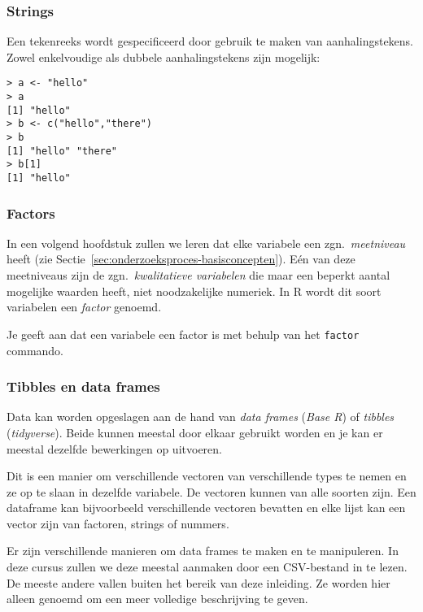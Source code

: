 \subsubsection{Strings}

Een tekenreeks wordt gespecificeerd door gebruik te maken van aanhalingstekens. Zowel enkelvoudige als dubbele aanhalingstekens zijn mogelijk:

\begin{lstlisting}
> a <- "hello"
> a
[1] "hello"
> b <- c("hello","there")
> b
[1] "hello" "there"
> b[1]
[1] "hello"
\end{lstlisting}

\subsubsection{Factors}

In een volgend hoofdstuk zullen we leren dat elke variabele een zgn.~\textit{meetniveau} heeft (zie Sectie~\ref{sec:onderzoeksproces-basisconcepten}). Eén van deze meetniveaus zijn de zgn.~\textit{kwalitatieve variabelen} die maar een beperkt aantal mogelijke waarden heeft, niet noodzakelijke numeriek. In R wordt dit soort variabelen een \textit{factor} genoemd.

Je geeft aan dat een variabele een factor is met behulp van het \texttt{factor} commando. 

\subsubsection{Tibbles en data frames}

Data kan worden opgeslagen aan de hand van \textit{data frames} (\textit{Base R}) of \textit{tibbles} (\textit{tidyverse}). Beide kunnen meestal door elkaar gebruikt worden en je kan er meestal dezelfde bewerkingen op uitvoeren.

Dit is een manier om verschillende vectoren van verschillende types te nemen en ze op te slaan in dezelfde variabele. De vectoren kunnen van alle soorten zijn. Een dataframe kan bijvoorbeeld verschillende vectoren bevatten en elke lijst kan een vector zijn van factoren, strings of nummers.

Er zijn verschillende manieren om data frames te maken en te manipuleren. In deze cursus zullen we deze meestal aanmaken door een CSV-bestand in te lezen. De meeste andere vallen buiten het bereik van deze inleiding. Ze worden hier alleen genoemd om een meer volledige beschrijving te geven. 

